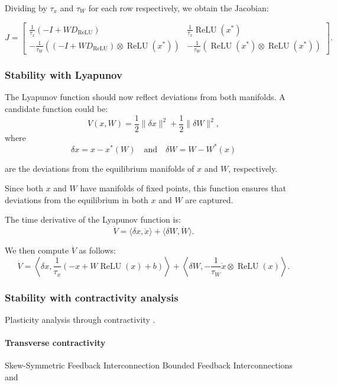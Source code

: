 \documentclass{article}
\theoremstyle{definition} \newtheorem{definition}{Definition}
\theoremstyle{remark} \newtheorem{remark}{Remark}
\newcounter{ct}
\begin{document}
Dividing by \( \tau_x \) and \( \tau_W \) for each row respectively, we obtain the Jacobian:

\begin{equation}
J =
\begin{bmatrix}
    \frac{1}{\tau_x} (-I + W D_{\operatorname{ReLU}}) & \frac{1}{\tau_x} \operatorname{ReLU}(x^*) \\
    -\frac{1}{\tau_W} ((-I + W D_{\operatorname{ReLU}}) \otimes \operatorname{ReLU}(x^*)) & -\frac{1}{\tau_W} (\operatorname{ReLU}(x^*) \otimes \operatorname{ReLU}(x^*))
\end{bmatrix}.
\end{equation}

\subsubsection{Stability with Lyapunov}
The Lyapunov function should now reflect deviations from both manifolds. A candidate function could be:
\[
V(x, W) = \frac{1}{2} \| \delta x \|^2 + \frac{1}{2} \| \delta W \|^2,
\]
where 
\[
\delta x = x - x^*(W) \quad \text{and} \quad \delta W = W - W^*(x)
\]

are the deviations from the equilibrium manifolds of \(x\) and \(W\), respectively.

Since both \(x\) and \(W\) have manifolds of fixed points, this function ensures that deviations from the equilibrium in both \(x\) and \(W\) are captured.

The time derivative of the Lyapunov function is:
\[
\dot{V} = \langle \delta x, \dot{x} \rangle + \langle \delta W, \dot{W} \rangle.
\]

We then compute \(\dot{V}\) as follows:
\[
\dot{V} = \left\langle \delta x, \frac{1}{\tau_x} \left( -x + W \operatorname{ReLU}(x) + b \right) \right\rangle 
+ \left\langle \delta W, -\frac{1}{\tau_W} \dot{x} \otimes \operatorname{ReLU}(x) \right\rangle.
\]

\subsubsection{Stability with contractivity analysis}

Plasticity analysis through contractivity \citep{kozachkov2022matrix} \citep{centorrino2024modeling}.

\paragraph{Transverse contractivity}
Skew-Symmetric Feedback Interconnection \citep{manchester2014transverse}
Bounded Feedback Interconnections \citep{wang2005contraction} and \citep{manchester2014transverse}
\end{document}
